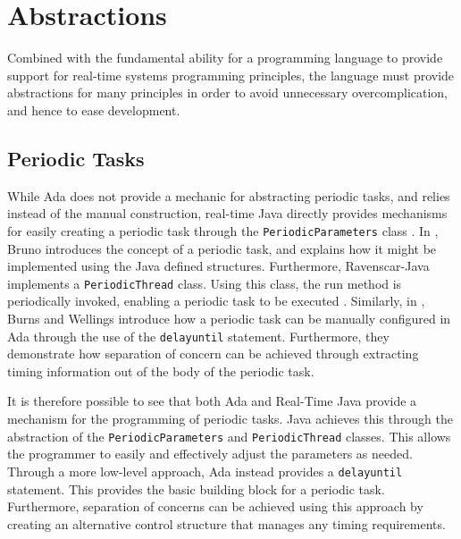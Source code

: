\section{Abstractions}

Combined with the fundamental ability for a programming language to provide support 
for real-time systems programming principles, the language must provide abstractions 
for many principles in order to avoid unnecessary overcomplication, and hence to 
ease development.

\subsection{Periodic Tasks}
While Ada does not provide a mechanic for abstracting periodic tasks, and relies 
instead of the manual construction, real-time Java directly provides mechanisms 
for easily creating a periodic task through the \texttt{PeriodicParameters} class 
\cite{real-time-systems}. In \cite{periodic-java-thread}, Bruno introduces the 
concept of a periodic task, and explains how it might be implemented using the 
Java defined structures. 
Furthermore, Ravenscar-Java implements a \texttt{PeriodicThread} class. Using 
this class, the run method is periodically invoked, enabling a periodic task to 
be executed \cite{ravenscar-java}.
Similarly, in \cite{burns1998concurrency}, Burns and Wellings introduce how a 
periodic task can be manually configured in Ada through the use 
of the \texttt{delay\textunderscore{}until} statement. 
Furthermore, they demonstrate how separation of concern can be achieved through 
extracting timing information out of the body of the periodic task. 
\par\bigskip\noindent
It is therefore possible to see that both Ada and Real-Time Java provide a mechanism for 
the programming of periodic tasks. Java achieves this through the abstraction of 
the \texttt{PeriodicParameters} and \texttt{PeriodicThread} classes. 
This allows the programmer to easily and effectively adjust the parameters as needed. 
Through a more low-level approach, Ada instead provides a \texttt{delay\textunderscore{}until}
statement. This provides the basic building block for a periodic task. Furthermore, 
separation of concerns can be achieved using this approach by creating an alternative 
control structure that manages any timing requirements.

